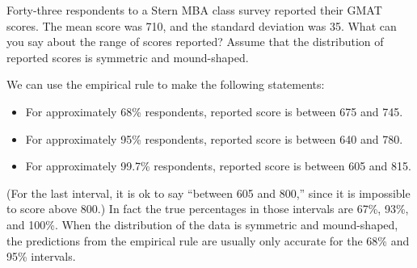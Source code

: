 \documentclass[answers,11pt]{exam}
\begin{document}
\begin{questions}

\newpage
{}


\question Forty-three respondents to a Stern MBA class survey reported their GMAT
scores.  The mean score was 710, and the standard deviation was 35.  What can
you say about the range of scores reported?  Assume that the distribution of
reported scores is symmetric and mound-shaped.

\begin{solution}
We can use the empirical rule to make the following statements:
\begin{itemize}
  \item For approximately 68\% respondents, reported score is between 675 and
    745.
  \item For approximately 95\% respondents, reported score is between 640 and
    780.
  \item For approximately 99.7\% respondents, reported score is between 605 and
    815.
\end{itemize}
(For the last interval, it is ok to say ``between 605 and 800,'' since it is
impossible to score above 800.)
In fact the true percentages in those intervals are 67\%, 93\%, and 100\%.
When the distribution of the data is symmetric and mound-shaped, the
predictions from the empirical rule are usually only accurate for the 68\% and
95\% intervals.
\end{solution}


%


\end{questions}
\end{document}
